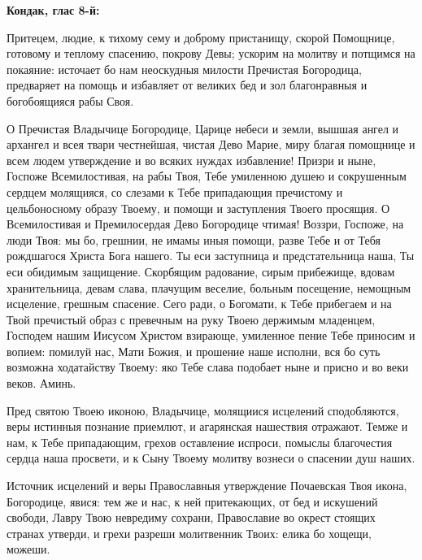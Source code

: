\medskip\bfseries Кондак, глас 8-й\normalfont{}:


Притецем, людие, к тихому сему и доброму пристанищу, скорой Помощнице, готовому и теплому спасению, покрову Девы; ускорим на молитву и потщимся на покаяние: источает бо нам неоскудныя милости Пречистая Богородица, предваряет на помощь и избавляет от великих бед и зол благонравныя и богобоящияся рабы Своя.




О Пречистая Владычице Богородице, Царице небеси и земли, вышшая ангел и архангел и всея твари честнейшая, чистая Дево Марие, миру благая помощнице и всем людем утверждение и во всяких нуждах избавление! Призри и ныне, Госпоже Всемилостивая, на рабы Твоя, Тебе умиленною душею и сокрушенным сердцем молящияся, со слезами к Тебе припадающия пречистому и цельбоносному образу Твоему, и помощи и заступления Твоего просящия. О Всемилостивая и Премилосердая Дево Богородице чтимая! Воззри, Госпоже, на люди Твоя: мы бо, грешнии, не имамы иныя помощи, разве Тебе и от Тебя рождшагося Христа Бога нашего. Ты еси заступница и предстательница наша, Ты еси обидимым защищение. Скорбящим радование, сирым прибежище, вдовам хранительница, девам слава, плачущим веселие, больным посещение, немощным исцеление, грешным спасение. Сего ради, о Богомати, к Тебе прибегаем и на Твой пречистый образ с превечным на руку Твоею держимым младенцем, Господем нашим Иисусом Христом взирающе, умиленное пение Тебе приносим и вопием: помилуй нас, Мати Божия, и прошение наше исполни, вся бо суть возможна ходатайству Твоему: яко Тебе слава подобает ныне и присно и во веки веков. Аминь.
\mychapterending

 



Пред святою Твоею иконою, Владычице, молящиися исцелений сподобляются, веры истинныя познание приемлют, и агарянская нашествия отражают. Темже и нам, к Тебе припадающим, грехов оставление испроси, помыслы благочестия сердца наша просвети, и к Сыну Твоему молитву вознеси о спасении душ наших.




Источник исцелений и веры Православныя утверждение Почаевская Твоя икона, Богородице, явися: тем же и нас, к ней притекающих, от бед и искушений свободи, Лавру Твою невредиму сохрани, Православие во окрест стоящих странах утверди, и грехи разреши молитвенник Твоих: елика бо хощещи, можеши.


